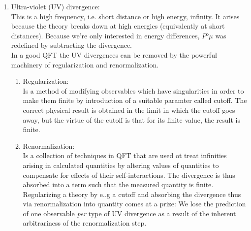 \begin{enumerate}
\begin{mybox}{Free scalar vacuum energy renormalization by cutoff regularization}
	\begin{equation}
		V_0 = V_0(\Lambda) = \rho - \expval{\mH}(\Lambda)
	\end{equation}
	with
	\begin{equation}
		\expval{\mH}(\Lambda)= \frac{1}{(2\pi)^2} \int_0^\Lambda \md \abs{\vec{p}}\abs{\vec{p}}^2 \sqrt{\abs{\vec{p}}^2+m^2} \propto \Lambda^4
	\end{equation}
	and experimentally determine the renormalized vacuum energy density $\rho$ that is finite as $\Lambda \rightarrow\infty$
	\begin{equation}
		\frac{\tilde{H}}{vol\mR^3}\ket{0}= \rho \ket{0}.
	\end{equation}
\end{mybox}
Note that because cutoff regularization of the $3$-momentum $\abs{\vec{p}}$ breaks Lorentz symmetry, the result $\expval{\mH}\propto \Lambda^4$ is incorrect. A regularization scheme that respects Lorentz symmetry is dimensional regularization and leads to $\expval{\mH}\propto m^4$. Nevertheless, adding an infinite constant to the Hamiltonian (and Lagrangian) such that the difference of two infinities becomes a finite observable is the basic idea of renormalization. We will come back to a more detailed discussion of vacuum energy regularization and renormalization and its connection to the cosmological constant of GR later on, .
\item Ultra-violet (UV) divergence:\\
This is a high frequency, i.e. short distance or high energy, infinity. It arises because the theory breaks down at high energies (equivalently at short distances). Because we're only interested in energy differences, $P°{\mu}$ was redefined by subtracting the divergence.\\
In a good QFT the UV divergences can be removed by the powerful machinery of regularization and renormalization.
\begin{enumerate}
	\item Regularization:\\
	Is a method of modifying observables which have singularities in order to make them finite by introduction of a suitable paramter called cutoff. The correct physical result is obtained in the limit in which the cutoff goes away, but the virtue of the cutoff is that for its finite value, the result is finite.
	\item Renormalization:\\
	Is a collection of techniques in QFT that are used ot treat infinities arising in calculated quantities by altering values of quantities to compensate for effects of their self-interactions. The divergence is thus absorbed into a term such that the measured quantity is finite. Regularizing a theory by e..g a cutoff and absorbing the divergence thus via renormalization into quantity comes at a prize: We lose the prediction of one observable \emph{per} type of UV divergence as a result of the inherent arbitrariness of the renormalization step.

\end{enumerate}
\end{enumerate}
